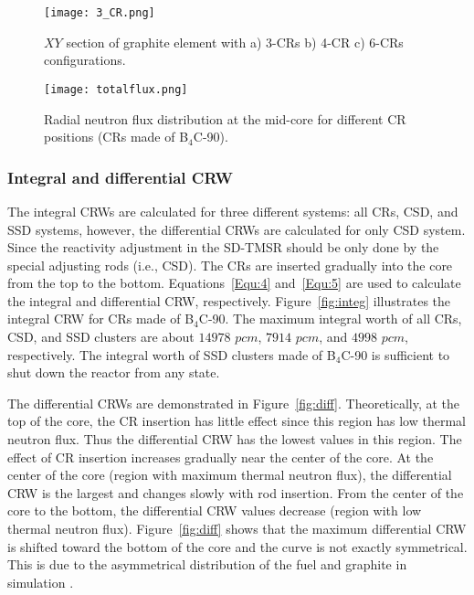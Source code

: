 \begin{figure}[!ht]
	\centering
	\texttt{[image: 3\_CR.png]}
	\vspace{-0.5in}
	\caption{$XY$ section of graphite element with a) 3-CRs b) 4-CR c) 6-CRs configurations.} 
	\label{fig:3_CR}
\end{figure}

\begin{figure}[!ht]
	\centering
	\texttt{[image: totalflux.png]}
	\vspace{-0.5in}
	\caption{Radial neutron flux distribution at the mid-core for different 
	CR positions (CRs made of B$_4$C-90).} 
	\label{fig:totalflux}
\end{figure}
 

\subsubsection{Integral and differential CRW}

The integral CRWs are calculated for three different systems: all CRs, CSD, and SSD systems, however, the differential CRWs are calculated for only CSD system. Since the reactivity adjustment in the SD-TMSR should be only done by the special adjusting rods (i.e., CSD).
The CRs are inserted gradually into the core from the top to the bottom. 
Equations~\ref{Equ:4} and~\ref{Equ:5} are used to calculate the integral and 
differential CRW, respectively. Figure~\ref{fig:integ} illustrates the integral CRW for CRs 
made of B$_4$C-90. The maximum integral worth of all CRs, CSD, and SSD 
clusters are about $14978$ $pcm$, $7914$ $pcm$, and $4998$ $pcm$, respectively. The 
integral worth of SSD clusters made of B$_4$C-90 is sufficient to shut down the reactor from any 
state.

The differential CRWs are demonstrated in Figure~\ref{fig:diff}. Theoretically, at the top of the core, the CR insertion has little effect since this region has low thermal neutron flux. Thus the differential CRW has the lowest values in this region. The effect of CR insertion increases gradually near the center of the core. At the center of the core (region with maximum thermal neutron flux), the differential CRW is the largest and changes slowly with rod insertion. From the center of the core to the bottom, the differential CRW values decrease (region with low thermal neutron flux). Figure~\ref{fig:diff} shows that the maximum differential CRW is shifted toward the bottom of the core and the curve is not exactly symmetrical. This is due to the asymmetrical distribution of the fuel and graphite in simulation \cite{xuemei2013study,son2016control}.

